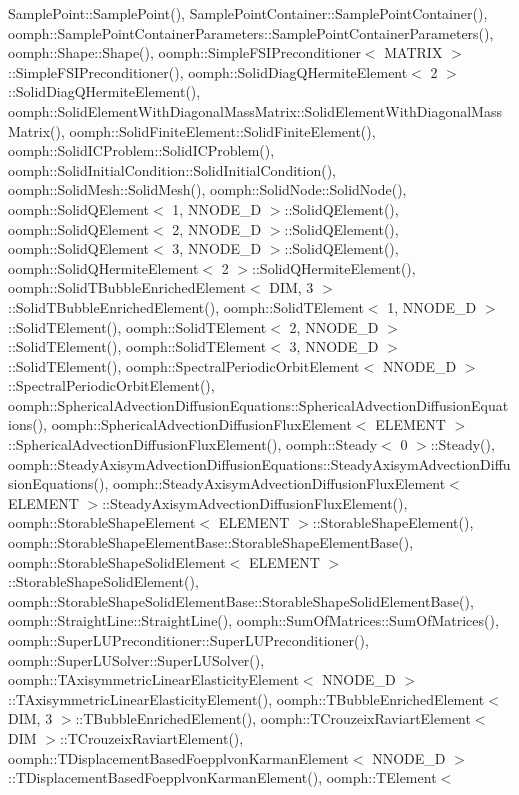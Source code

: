 Sample\+Point\+::\+Sample\+Point(), Sample\+Point\+Container\+::\+Sample\+Point\+Container(), oomph\+::\+Sample\+Point\+Container\+Parameters\+::\+Sample\+Point\+Container\+Parameters(), oomph\+::\+Shape\+::\+Shape(), oomph\+::\+Simple\+F\+S\+I\+Preconditioner$<$ M\+A\+T\+R\+I\+X $>$\+::\+Simple\+F\+S\+I\+Preconditioner(), oomph\+::\+Solid\+Diag\+Q\+Hermite\+Element$<$ 2 $>$\+::\+Solid\+Diag\+Q\+Hermite\+Element(), oomph\+::\+Solid\+Element\+With\+Diagonal\+Mass\+Matrix\+::\+Solid\+Element\+With\+Diagonal\+Mass\+Matrix(), oomph\+::\+Solid\+Finite\+Element\+::\+Solid\+Finite\+Element(), oomph\+::\+Solid\+I\+C\+Problem\+::\+Solid\+I\+C\+Problem(), oomph\+::\+Solid\+Initial\+Condition\+::\+Solid\+Initial\+Condition(), oomph\+::\+Solid\+Mesh\+::\+Solid\+Mesh(), oomph\+::\+Solid\+Node\+::\+Solid\+Node(), oomph\+::\+Solid\+Q\+Element$<$ 1, N\+N\+O\+D\+E\+\_\+D $>$\+::\+Solid\+Q\+Element(), oomph\+::\+Solid\+Q\+Element$<$ 2, N\+N\+O\+D\+E\+\_\+D $>$\+::\+Solid\+Q\+Element(), oomph\+::\+Solid\+Q\+Element$<$ 3, N\+N\+O\+D\+E\+\_\+D $>$\+::\+Solid\+Q\+Element(), oomph\+::\+Solid\+Q\+Hermite\+Element$<$ 2 $>$\+::\+Solid\+Q\+Hermite\+Element(), oomph\+::\+Solid\+T\+Bubble\+Enriched\+Element$<$ D\+I\+M, 3 $>$\+::\+Solid\+T\+Bubble\+Enriched\+Element(), oomph\+::\+Solid\+T\+Element$<$ 1, N\+N\+O\+D\+E\+\_\+D $>$\+::\+Solid\+T\+Element(), oomph\+::\+Solid\+T\+Element$<$ 2, N\+N\+O\+D\+E\+\_\+D $>$\+::\+Solid\+T\+Element(), oomph\+::\+Solid\+T\+Element$<$ 3, N\+N\+O\+D\+E\+\_\+D $>$\+::\+Solid\+T\+Element(), oomph\+::\+Spectral\+Periodic\+Orbit\+Element$<$ N\+N\+O\+D\+E\+\_\+D $>$\+::\+Spectral\+Periodic\+Orbit\+Element(), oomph\+::\+Spherical\+Advection\+Diffusion\+Equations\+::\+Spherical\+Advection\+Diffusion\+Equations(), oomph\+::\+Spherical\+Advection\+Diffusion\+Flux\+Element$<$ E\+L\+E\+M\+E\+N\+T $>$\+::\+Spherical\+Advection\+Diffusion\+Flux\+Element(), oomph\+::\+Steady$<$ 0 $>$\+::\+Steady(), oomph\+::\+Steady\+Axisym\+Advection\+Diffusion\+Equations\+::\+Steady\+Axisym\+Advection\+Diffusion\+Equations(), oomph\+::\+Steady\+Axisym\+Advection\+Diffusion\+Flux\+Element$<$ E\+L\+E\+M\+E\+N\+T $>$\+::\+Steady\+Axisym\+Advection\+Diffusion\+Flux\+Element(), oomph\+::\+Storable\+Shape\+Element$<$ E\+L\+E\+M\+E\+N\+T $>$\+::\+Storable\+Shape\+Element(), oomph\+::\+Storable\+Shape\+Element\+Base\+::\+Storable\+Shape\+Element\+Base(), oomph\+::\+Storable\+Shape\+Solid\+Element$<$ E\+L\+E\+M\+E\+N\+T $>$\+::\+Storable\+Shape\+Solid\+Element(), oomph\+::\+Storable\+Shape\+Solid\+Element\+Base\+::\+Storable\+Shape\+Solid\+Element\+Base(), oomph\+::\+Straight\+Line\+::\+Straight\+Line(), oomph\+::\+Sum\+Of\+Matrices\+::\+Sum\+Of\+Matrices(), oomph\+::\+Super\+L\+U\+Preconditioner\+::\+Super\+L\+U\+Preconditioner(), oomph\+::\+Super\+L\+U\+Solver\+::\+Super\+L\+U\+Solver(), oomph\+::\+T\+Axisymmetric\+Linear\+Elasticity\+Element$<$ N\+N\+O\+D\+E\+\_\+D $>$\+::\+T\+Axisymmetric\+Linear\+Elasticity\+Element(), oomph\+::\+T\+Bubble\+Enriched\+Element$<$ D\+I\+M, 3 $>$\+::\+T\+Bubble\+Enriched\+Element(), oomph\+::\+T\+Crouzeix\+Raviart\+Element$<$ D\+I\+M $>$\+::\+T\+Crouzeix\+Raviart\+Element(), oomph\+::\+T\+Displacement\+Based\+Foepplvon\+Karman\+Element$<$ N\+N\+O\+D\+E\+\_\+D $>$\+::\+T\+Displacement\+Based\+Foepplvon\+Karman\+Element(), oomph\+::\+T\+Element$<$ 
